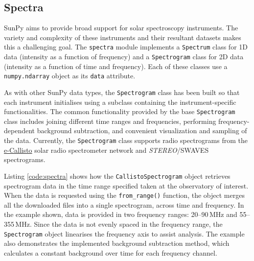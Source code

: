 \subsection{Spectra}\label{sec:spectra}
SunPy aims to provide broad support for solar spectroscopy
instruments.  The variety and complexity of these instruments and
their resultant datasets makes this a challenging goal.  The \texttt{spectra} module implements a
\texttt{Spectrum} class for 1D data (intensity as a function of frequency) and a
\texttt{Spectrogram} class for 2D data (intensity as a function of time and
frequency).  Each of these classes use a \texttt{numpy.ndarray} object
as its \texttt{data} attribute.  

As with other SunPy data types, the \texttt{Spectrogram} class has been
built so that each instrument initialises using a subclass containing the instrument-specific 
functionalities. The common functionality provided by the base \texttt{Spectrogram} class includes
joining different time ranges and frequencies, performing frequency-dependent background subtraction,
and convenient visualization and sampling of the data.
Currently, the \texttt{Spectrogram} class supports radio spectrograms from the 
\href{http://www.e-callisto.org/}{e-Callisto}
solar radio spectrometer network and \textit{STEREO}/SWAVES spectrograms.

Listing \ref{code:spectra} shows how the \texttt{CallistoSpectrogram}
object retrieves spectrogram data in the time range specified taken at
the observatory of interest.  When the data is requested using the
\texttt{from\_range()} function, the object merges all the downloaded
files into a single spectrogram, across time and frequency.
In the example shown, data is provided in two frequency ranges:
20--90\,MHz and 55--355\,MHz.  Since the data is not evenly spaced in
the frequency range, the \texttt{Spectrogram} object linearises the
frequency axis to assist analysis.  The example also demonstrates
the implemented background subtraction method, which calculates
a constant background over time for each frequency channel.

